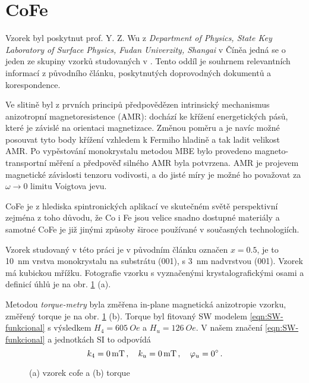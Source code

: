 \section{CoFe}
\label{chap:vzorek-cofe}

Vzorek byl poskytnut prof. Y. Z. Wu z \emph{Department of Physics, State Key Laboratory of Surface Physics, Fudan Univerzity, Shangai} v Číněa jedná se o jeden ze skupiny vzorků studovaných v \cite{zengIntrinsicMechanismAnisotropic2020}.
Tento oddíl je souhrnem relevantních informací z původního článku, poskytnutých doprovodných dokumentů a korespondence.

Ve slitině  byl z prvních principů předpovědězen intrinsický mechanismus anizotropní magnetoresistence (AMR): dochází ke křížení energetických pásů, které je závislé na orientaci magnetizace.
Změnou poměru  a  je navíc možné posouvat tyto body křížení vzhledem k Fermiho hladině a tak ladit velikost AMR.
Po vypěstování monokrystalu metodou MBE bylo provedeno magneto-transportní měření a předpověď silného AMR byla potvrzena.
AMR je projevem magnetické závislosti tenzoru vodivosti, a do jisté míry je možné ho považovat za $\omega\to 0$ limitu Voigtova jevu.

CoFe je z hlediska spintronických aplikací ve skutečném světě perspektivní zejména z toho důvodu, že Co i Fe jsou velice snadno dostupné materiály a samotné CoFe je již jinými způsoby široce používané v současných technologiích.

Vzorek studovaný v této práci je v původním článku označen $x=0.5$, je to \SI{10}{\nano\meter} vrstva monokrystalu  na substrátu (001), s \SI{3}{\nano\meter} nadvrstvou (001).
Vzorek má kubickou mřížku.
Fotografie vzorku s vyznačenými krystalografickými osami a definicí úhlů je na obr. \ref{fig:vzorek-cofe} (a).

Metodou \emph{torque-metry} byla změřena in-plane magnetická anizotropie vzorku, změřený torque je na obr. \ref{fig:vzorek-cofe} (b).
Torque byl fitovaný SW modelem \eqref{eqn:SW-funkcional} s výsledkem $H_4=\SI{605}{Oe}$ a $H_u=\SI{126}{Oe}$.
V našem značení \eqref{eqn:SW-funkcional} a jednotkách SI to odpovídá
\begin{equation}
    k_4 = \SI{0}{\milli\tesla} \,,\quad k_u = \SI{0}{mT} \,,\quad \varphi_u = \SI{0}{\degree} \,.
\end{equation}

\begin{figure}[htbp]
    \centering
    \caption{(a) vzorek cofe a (b) torque}
    \label{fig:vzorek-cofe}
\end{figure}
